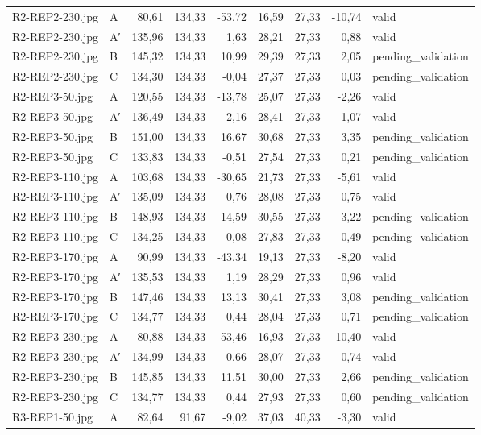 \begin{scriptsize}
\begin{longtable}{@{}llrrrrrrl@{}}
R2-REP2-230.jpg & A & 80,61 & 134,33 & -53,72 & 16,59 & 27,33 & -10,74 & valid \\
R2-REP2-230.jpg & A′ & 135,96 & 134,33 & 1,63 & 28,21 & 27,33 & 0,88 & valid \\
R2-REP2-230.jpg & B & 145,32 & 134,33 & 10,99 & 29,39 & 27,33 & 2,05 & pending\_validation \\
R2-REP2-230.jpg & C & 134,30 & 134,33 & -0,04 & 27,37 & 27,33 & 0,03 & pending\_validation \\
R2-REP3-50.jpg & A & 120,55 & 134,33 & -13,78 & 25,07 & 27,33 & -2,26 & valid \\
R2-REP3-50.jpg & A′ & 136,49 & 134,33 & 2,16 & 28,41 & 27,33 & 1,07 & valid \\
R2-REP3-50.jpg & B & 151,00 & 134,33 & 16,67 & 30,68 & 27,33 & 3,35 & pending\_validation \\
R2-REP3-50.jpg & C & 133,83 & 134,33 & -0,51 & 27,54 & 27,33 & 0,21 & pending\_validation \\
R2-REP3-110.jpg & A & 103,68 & 134,33 & -30,65 & 21,73 & 27,33 & -5,61 & valid \\
R2-REP3-110.jpg & A′ & 135,09 & 134,33 & 0,76 & 28,08 & 27,33 & 0,75 & valid \\
R2-REP3-110.jpg & B & 148,93 & 134,33 & 14,59 & 30,55 & 27,33 & 3,22 & pending\_validation \\
R2-REP3-110.jpg & C & 134,25 & 134,33 & -0,08 & 27,83 & 27,33 & 0,49 & pending\_validation \\
R2-REP3-170.jpg & A & 90,99 & 134,33 & -43,34 & 19,13 & 27,33 & -8,20 & valid \\
R2-REP3-170.jpg & A′ & 135,53 & 134,33 & 1,19 & 28,29 & 27,33 & 0,96 & valid \\
R2-REP3-170.jpg & B & 147,46 & 134,33 & 13,13 & 30,41 & 27,33 & 3,08 & pending\_validation \\
R2-REP3-170.jpg & C & 134,77 & 134,33 & 0,44 & 28,04 & 27,33 & 0,71 & pending\_validation \\
R2-REP3-230.jpg & A & 80,88 & 134,33 & -53,46 & 16,93 & 27,33 & -10,40 & valid \\
R2-REP3-230.jpg & A′ & 134,99 & 134,33 & 0,66 & 28,07 & 27,33 & 0,74 & valid \\
R2-REP3-230.jpg & B & 145,85 & 134,33 & 11,51 & 30,00 & 27,33 & 2,66 & pending\_validation \\
R2-REP3-230.jpg & C & 134,77 & 134,33 & 0,44 & 27,93 & 27,33 & 0,60 & pending\_validation \\
R3-REP1-50.jpg & A & 82,64 & 91,67 & -9,02 & 37,03 & 40,33 & -3,30 & valid \\

\end{longtable}
\end{scriptsize}
